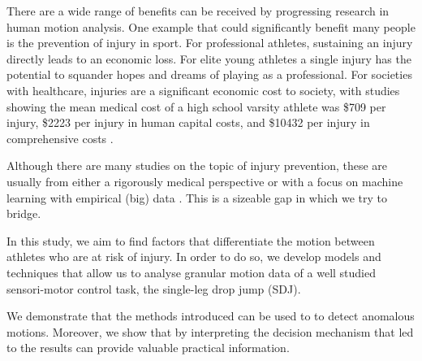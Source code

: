 There are a wide range of benefits can be received by progressing research in human motion analysis. One example that could significantly benefit many people is the prevention of injury in sport. For professional athletes, sustaining an injury directly leads to an economic loss. For elite young athletes a single injury has the potential to squander hopes and dreams of playing as a professional. For societies with healthcare, injuries are a significant economic cost to society, with studies showing the mean medical cost of a high school varsity athlete was \$709 per injury, \$2223 per injury in human capital costs, and \$10432 per injury in comprehensive costs \cite{knowles2007cost}.

Although there are many studies on the topic of injury prevention, these are usually from either a rigorously medical perspective \cite{myer2004rationale} or with a focus on machine learning with empirical (big) data \cite{alderson2015markerless}. This is a sizeable gap in which we try to bridge. 

In this study, we aim to find factors that differentiate the motion between athletes who are at risk of injury. In order to do so, we develop models and techniques that allow us to analyse granular motion data of a well studied sensori-motor control task, the single-leg drop jump (SDJ). 

We demonstrate that the methods introduced can be used to to detect anomalous motions. Moreover, we show that by interpreting the decision mechanism that led to the results can provide valuable practical information.






